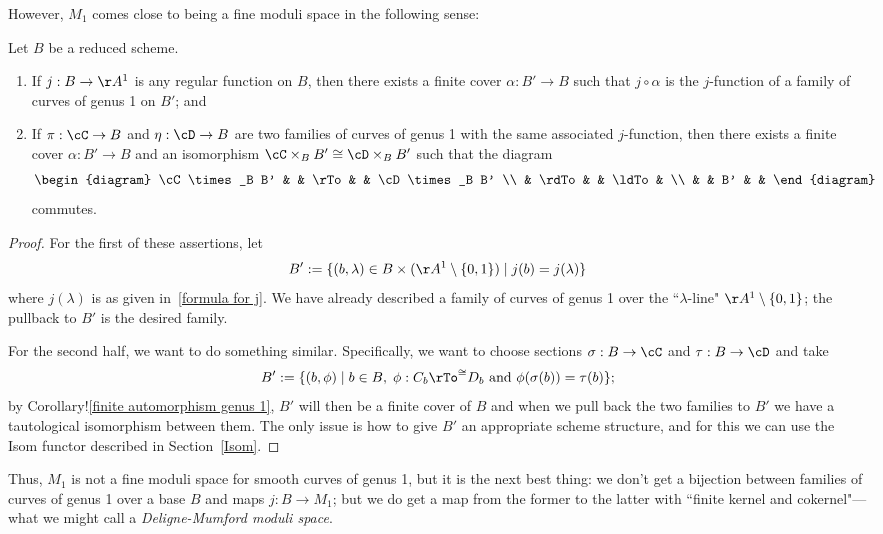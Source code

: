 However, $M_1$ comes close to being a fine moduli space in the following sense:

\begin{proposition}\label{families on pullbacks} Let $B$ be a reduced scheme.
\begin{enumerate}
\item If $j : B \to \AA^1$ is any regular function on $B$, then there exists a finite cover $\alpha : B' \to B$ such that $j \circ \alpha$ is the $j$-function of a family of curves of genus 1 on $B'$; and
\item If $\pi : \cC \to B$ and $\eta : \cD \to B$ are two families of curves of genus 1 with the same associated $j$-function, then there exists a finite cover $\alpha : B' \to B$ and an isomorphism $\cC \times_B B' \cong \cD \times_B B'$ such that the diagram
$$
\begin{diagram}
\cC \times_B B' & & \rTo & & \cD \times_B B' \\
& \rdTo & & \ldTo & \\
& & B' & &
\end{diagram} 
$$
commutes.
\end{enumerate}
\end{proposition}

\begin{proof} For the first of these assertions, let
$$
B' := \{(b, \lambda) \in B \times (\AA^1 \setminus \{0,1\}) \mid j(b) = j(\lambda)\}
$$
where $j(\lambda)$ is as given in~\ref{formula for j}. We have already described a family of curves of genus 1 over the ``$\lambda$-line" $\AA^1 \setminus \{0,1\}$; the pullback to $B'$ is the desired family.

For the second half, we want to do something similar. Specifically, we want to choose sections $\sigma : B \to \cC$ and $\tau: B \to \cD$ and take
$$
B' := \{ (b, \phi) \mid b \in B, \; \phi : C_b \rTo^{\cong} D_b  \text{ and } \phi(\sigma(b)) = \tau(b) \};
$$
by Corollary!\ref{finite automorphism genus 1}, $B'$ will then be a finite cover of $B$ and when we pull back the two families to $B'$ we have a tautological isomorphism between them. The only issue is how to give $B'$ an appropriate scheme structure, and for this we can use the Isom functor described in Section~\ref{Isom}.
\end{proof}

Thus, $M_1$ is not a fine moduli space for smooth curves of genus 1, but it is the next best thing: we don't get a bijection between families of curves of genus 1 over a base $B$ and maps $j : B \to M_1$; but we do get a map from the former to the latter with ``finite kernel and cokernel"---what we might call a \emph{Deligne-Mumford moduli space}.

